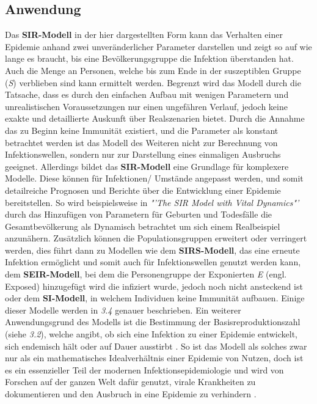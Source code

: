 \documentclass[12pt]{scrartcl} %
\begin{document}

\subsection{Anwendung}

Das \textbf{SIR-Modell} in der hier dargestellten Form kann das Verhalten einer Epidemie anhand zwei unveränderlicher Parameter darstellen und zeigt so auf wie lange es braucht, bis eine Bevölkerungsgruppe die Infektion überstanden hat. Auch die Menge an Personen, welche bis zum Ende in der suszeptiblen Gruppe (\textit{S}) verblieben sind kann ermittelt werden. 
Begrenzt wird das Modell durch die Tatsache, dass es durch den einfachen Aufbau mit wenigen Parametern und unrealistischen Voraussetzungen nur einen ungefähren Verlauf, jedoch keine exakte und detaillierte Auskunft über Realszenarien bietet.
Durch die Annahme das zu Beginn keine Immunität existiert, und die Parameter als konstant betrachtet werden ist das Modell des Weiteren nicht zur Berechnung von Infektionswellen, sondern nur zur Darstellung eines einmaligen Ausbruchs geeignet.
Allerdings bildet das \textbf{SIR-Modell} eine Grundlage für komplexere Modelle. Diese können für Infektionen/ Umstände angepasst werden, und somit detailreiche Prognosen und Berichte über die Entwicklung einer Epidemie bereitstellen.
So wird beispielsweise in \textsl{"'The SIR Model with Vital Dynamics"'} \cite{5} durch das Hinzufügen von Parametern für Geburten und Todesfälle die Gesamtbevölkerung als Dynamisch betrachtet um sich einem Realbeispiel anzunähern.
Zusätzlich können die Populationsgruppen erweitert oder verringert werden, dies führt dann zu Modellen wie dem 
\textbf{SIRS-Modell}, das eine erneute Infektion ermöglicht und somit auch für Infektionswellen genutzt werden kann, dem \textbf{SEIR-Modell}, bei dem die Personengruppe der Exponierten \textit{E} 
(engl. Exposed)  hinzugefügt wird die infiziert wurde, jedoch noch nicht ansteckend ist oder dem \textbf{SI-Modell}, in welchem Individuen keine Immunität aufbauen.
Einige dieser Modelle werden in \textsl{3.4} genauer beschrieben.
Ein weiterer Anwendungsgrund des Modells ist die Bestimmung der Basisreproduktionszahl (siehe \textsl{3.2}), welche angibt, ob sich eine Infektion zu einer Epidemie entwickelt, sich endemisch hält oder auf Dauer ausstirbt \cite{2}.
So ist das Modell als solches zwar nur als ein mathematisches Idealverhältnis einer Epidemie von Nutzen, doch ist es ein essenzieller Teil der modernen Infektionsepidemiologie und wird von Forschen auf der ganzen Welt dafür genutzt, virale Krankheiten zu dokumentieren und den Ausbruch in eine Epidemie zu verhindern \cite{3}.
\end{document}

